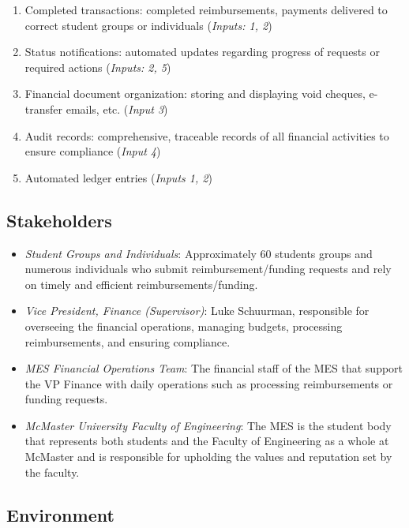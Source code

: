 \documentclass{article}
\begin{document}
\begin{enumerate}
    \item Completed transactions: completed reimbursements, payments delivered to correct student groups or individuals (\emph{Inputs: 1, 2})
    \item Status notifications: automated updates regarding progress of requests or required actions (\emph{Inputs: 2, 5})
    \item Financial document organization: storing and displaying void cheques, e-transfer emails, etc. (\emph{Input 3})
    \item Audit records: comprehensive, traceable records of all financial activities to ensure compliance (\emph{Input 4})
    \item Automated ledger entries (\emph{Inputs 1, 2})
\end{enumerate}

\subsection{Stakeholders}

\begin{itemize}
    \item \emph{Student Groups and Individuals}: Approximately 60 students groups and numerous individuals who submit reimbursement/funding requests and rely on timely and efficient reimbursements/funding.
    \item \emph{Vice President, Finance (Supervisor)}: Luke Schuurman, responsible for overseeing the financial operations, managing budgets, processing reimbursements, and ensuring compliance.
    \item \emph{MES Financial Operations Team}: The financial staff of the MES that support the VP Finance with daily operations such as processing reimbursements or funding requests. 
    \item \emph{McMaster University Faculty of Engineering}: The MES is the student body that represents both students and the Faculty of Engineering as a whole at McMaster and is responsible for upholding the values and reputation set by the faculty.
\end{itemize}

\subsection{Environment}

\end{document}
